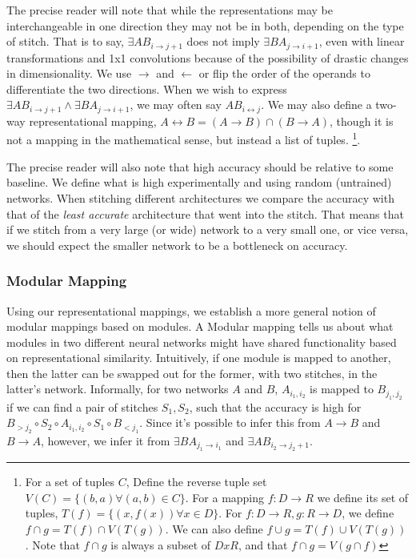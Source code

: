 \documentclass{article} %
\begin{document}
The precise reader will note that while the representations may be interchangeable in one direction
they may not be in both, depending on the type of stitch. That is to say,  \(\exists AB_{i \rightarrow j+1}\)
does not imply \(\exists BA_{j \rightarrow i+1}\), even with linear transformations and 1x1 convolutions
because of the possibility of drastic changes in dimensionality. We use \(\rightarrow\) and \(\leftarrow\)
or flip the order of the operands to differentiate the two directions.
When we wish to express \(\exists AB_{i \rightarrow j+1} \land \exists BA_{j \rightarrow i+1}\),
we may often say \(AB_{i \leftrightarrow j}\). We may also define a two-way representational mapping,
\(A \leftrightarrow B = (A \rightarrow B) \cap (B \rightarrow A)\), though it is not a mapping
in the mathematical sense, but instead a list of tuples.
\footnote{For a set of tuples \(C\), Define the reverse tuple set \(V(C) = \{(b, a) \forall (a, b) \in C\}\).
For a mapping \(f: D \to R\) we define its set of tuples, \(T(f) = \{(x, f(x)) \forall x \in D\}\).
For \(f: D \to R, g: R \to D\), we define \(f \cap g = T(f) \cap V(T(g))\). We can also define
\(f \cup g = T(f) \cup V(T(g))\). Note that \(f \cap g\) is always a subset of \(D x R\), and
that \(f \cap g = V(g \cap f)\)}.

The precise reader will also note that high accuracy should be relative to some baseline. We define what is high
experimentally and using random (untrained) networks. When stitching different architectures we compare the accuracy
with that of the \emph{least accurate} architecture that went into the stitch. That means that if we stitch from
a very large (or wide) network to a very small one, or vice versa, we should expect the smaller network to be a
bottleneck on accuracy.

\subsubsection*{Modular Mapping}
Using our representational mappings, we establish a more general notion of modular mappings based on modules. A Modular mapping
tells us about what modules in two different neural networks might have shared functionality based on representational similarity.
Intuitively, if one module is mapped to another, then the latter can be swapped out for the former, with two stitches, in the latter's network.
Informally, for two networks \(A\) and \(B\), \(A_{i_1, i_2}\) is mapped to \(B_{j_1, j_2}\) if we can find a pair of stitches \(S_1, S_2\), such that the accuracy is high for
\(B_{>j_2} \circ S_2 \circ A_{i_1,i_2} \circ S_1 \circ B_{<j_1}\). Since it's possible to infer this from \(A \rightarrow B\) and \(B \rightarrow A\),
however, we infer it from \(\exists BA_{j_1 \rightarrow i_1}\) and \(\exists AB_{i_2 \rightarrow j_2+1}\).
\end{document}
